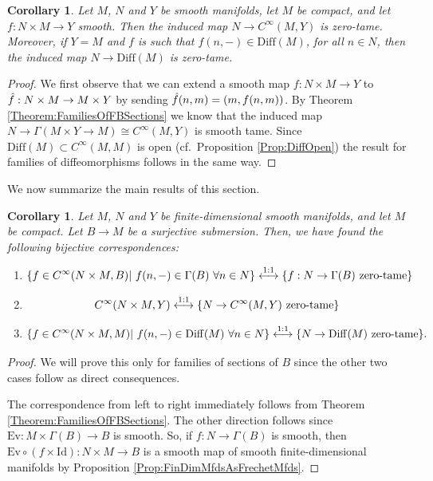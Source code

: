 \documentclass[12pt,a4paper]{article}
\theoremstyle{plain}
\newtheorem{corollary}[theorem]{Corollary}
\theoremstyle{definition}
\newcommand{\tn}{\textnormal}
\newcommand{\Diff}{\mathrm{Diff}(M)}
\newcommand{\Id}{\mathrm{Id}}
\newcommand{\Ev}{\mathrm{Ev}}
\begin{document}
\begin{corollary}
\label{FamiliesOfDiffeos}
Let $M$, $N$ and $Y$ be smooth manifolds, let $M$ be compact, and let $f:N\times M\to Y$ smooth. Then the induced map $N\to C^\infty(M,Y)$ is zero-tame. Moreover, if $Y=M$ and $f$ is such that $f(n,-)\in \Diff$, for all $ n\in N$, then the induced map $N\to \Diff$ is zero-tame.
\end{corollary}
\begin{proof}
We first observe that we can extend a smooth map $f:N\times M\to Y$ to 
$\Hat{f}:N\times M\to M\times Y$ by sending $\Hat{f}(n,m)=(m,f(n,m))$. By Theorem \ref{Theorem:FamiliesOfFBSections} we know that the induced map $N\to \Gamma(M\times Y\to M)\cong C^\infty(M,Y)$ is smooth tame. Since 
$\Diff \subset C^\infty(M,M)$ is open (cf.~Proposition \ref{Prop:DiffOpen}) the result for families of diffeomorphisms follows in the same way. 
\end{proof}


We now summarize the main results of this section.
\begin{corollary}
Let $M$, $N$ and $Y$ be finite-dimensional smooth manifolds, and let $M$ be compact. Let $B\to M$ be a surjective submersion. Then, we have found the following bijective correspondences:
\begin{enumerate}
    \item $$\{f\in C^\infty(N\times M,B)|~f(n,-)\in \Gamma(B)\ \forall n\in N\}\overset{1:1}{\longleftrightarrow} \{f:N\to \Gamma(B) \ \tn{zero-tame}\}$$
    \item $$C^\infty(N\times M,Y)\overset{1:1}{\longleftrightarrow} \{N\to C^\infty(M,Y) \ \tn{zero-tame}\}$$
    \item $$\{f\in C^\infty(N\times M,M)|~f(n,-)\in \Diff\ \forall n\in N\}\overset{1:1}{\longleftrightarrow} \{N\to \Diff \ \tn{zero-tame}\}.$$
\end{enumerate}
\end{corollary}
\begin{proof}
We will prove this only for families of sections of $B$ since the other two cases follow as direct consequences.

The correspondence from left to right immediately follows from Theorem \ref{Theorem:FamiliesOfFBSections}.
The other direction follows since $\Ev:M\times \Gamma(B)\to B$ is smooth. So, if $f:N\to \Gamma(B)$ is smooth, then $\Ev\circ (f\times \Id):N\times M\to B$ is a smooth map of smooth finite-dimensional manifolds by Proposition \ref{Prop:FinDimMfdsAsFrechetMfds}.  
\end{proof}
\end{document}
